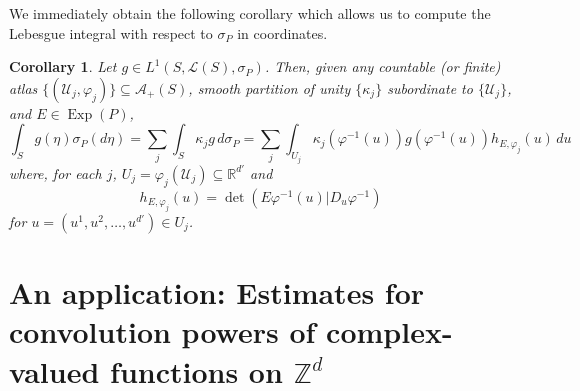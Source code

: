 \documentclass[11pt]{article}
\newtheorem{corollary}[theorem]{Corollary}
\newcommand\Exp{\operatorname{Exp}}
\renewcommand\det{\operatorname{det}}
\begin{document}
\noindent We immediately obtain the following corollary which allows us to compute the Lebesgue integral with respect to $\sigma_P$ in coordinates.
\begin{corollary}\label{cor:IntegralFormula}
Let $g\in L^1(S,\mathcal{L}(S),\sigma_P)$. Then, given any  countable (or finite) atlas $\{(\mathcal{U}_j,\varphi_j)\}\subseteq\mathcal{A}_+(S)$,  smooth partition of unity $\{\kappa_j\}$ subordinate to $\{\mathcal{U}_j\}$, and $E\in\Exp(P)$,
\begin{equation*}
\int_S g(\eta)\sigma_P(d\eta)=\sum_{j}\int_S \kappa_jg\,d\sigma_P=\sum_j\int_{U_j}\kappa_j(\varphi^{-1}(u))g(\varphi^{-1}(u))h_{E,\varphi_j}(u)\,du
\end{equation*}
where, for each $j$, $U_j=\varphi_j(\mathcal{U}_j)\subseteq\mathbb{R}^{d'}$ and
\begin{equation*}
    h_{E,\varphi_j}(u)=\det(E\varphi^{-1}(u)\vert D_u\varphi^{-1})
\end{equation*}
for $u=(u^1,u^2,\dots,u^{d'})\in U_j$. 
\end{corollary}





\section{An application: Estimates for convolution powers of complex-valued functions on $\mathbb{Z}^d$}\label{sec:ConvolutionPowers}
\end{document}
